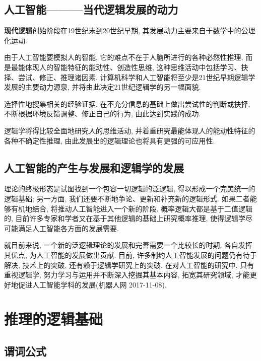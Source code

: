 \subsection{人工智能———当代逻辑发展的动力}

\textbf{现代逻辑}创始阶段在19世纪末到20世纪早期, 其发展动力主要来自于数学中的公理化运动.

由于人工智能要模拟人的智能, 它的难点不在于人脑所进行的各种必然性推理, 而是最能体现人的智能特征的能动性、创造性思维, 这种思维活动中包括学习、抉择、尝试、修正、推理诸因素.
计算机科学和人工智能将至少是21世纪早期逻辑学发展的主要动力源泉, 并将由此决定21世纪逻辑学的另一幅面貌.

\begin{example}
    选择性地搜集相关的经验证据, 在不充分信息的基础上做出尝试性的判断或抉择, 不断根据环境反馈调整、修正自己的行为, 由此达到实践的成功.
\end{example}
逻辑学将得比较全面地研究人的思维活动, 并着重研究最能体现人的能动性特征的各种不确定性推理, 由此发展出的逻辑理论也将具有更强的可应用性.
\subsection{人工智能的产生与发展和逻辑学的发展}

理论的终极形态是试图找到一个包容一切逻辑的泛逻辑, 得以形成一个完美统一的逻辑基础;
另一方面, 我们还要不断地争论、更新和补充新的逻辑形式. 如果二者能够有机地结合, 将推动人工智能进入一个新的阶段.
概率逻辑大都是基于二值逻辑的, 目前许多专家和学者又在基于其他逻辑的基础上研究概率推理, 使得逻辑学尽可能满足人工智能各方面的发展需要.

就目前来说, 一个新的泛逻辑理论的发展和完善需要一个比较长的时期, 各自发挥其优点, 为人工智能的发展做出贡献.
目前, 许多制约人工智能发展的问题仍有待于解决, 技术上的突破, 还有赖于逻辑学研究上的突破. 在对人工智能的研究中, 只有重视逻辑学, 努力学习与运用并不断深入挖掘其基本内容, 拓宽其研究领域, 才能更好地促进人工智能学科的发展(机器人网 2017-11-08).
\section{推理的逻辑基础}
\label{AI32C3Sec3.2}
\subsection{谓词公式}
